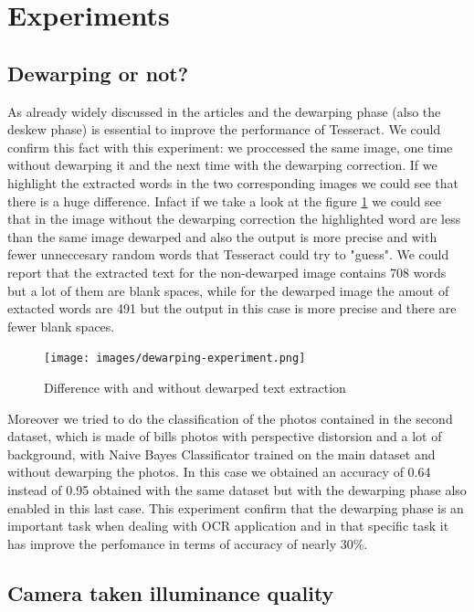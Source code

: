 \documentclass[10pt,twocolumn,letterpaper]{article}
\begin{document}
\section{Experiments}
\label{sec:experiments}

\subsection{Dewarping or not?}

As already widely discussed in the articles
\cite{Improvingcamera-based} and \cite{recoveringhomography} the
dewarping phase (also the deskew phase) is essential to improve the
performance of Tesseract. We could confirm this fact with this
experiment: we proccessed the same image, one time without dewarping
it and the next time with the dewarping correction. If we highlight
the extracted words in the two corresponding images we could see that
there is a huge difference. Infact if we take a look at the figure
\ref{dewarping-experiment} we could see that in the image without the
dewarping correction the highlighted word are less than the same image
dewarped and also the output is more precise and with fewer
unneccesary random words that Tesseract could try to "guess". We could
report that the extracted text for the non-dewarped image contains 708
words but a lot of them are blank spaces, while for the dewarped image
the amout of extacted words are 491 but the output in this case is
more precise and there are fewer blank spaces.

\begin{figure}[b]
  \centering
  \texttt{[image: images/dewarping-experiment.png]}
  \caption{Difference with and without dewarped text extraction}
  \label{dewarping-experiment}
\end{figure}

Moreover we tried to do the classification of the photos contained in
the second dataset, which is made of bills photos with perspective
distorsion and a lot of background, with Naive Bayes Classificator
trained on the main dataset and without dewarping the photos. In this
case we obtained an accuracy of 0.64 instead of 0.95 obtained with the
same dataset but with the dewarping phase also enabled in this last
case. This experiment confirm that the dewarping phase is an important
task when dealing with OCR application and in that specific task it
has improve the perfomance in terms of accuracy of nearly 30\%.

\subsection{Camera taken illuminance quality}
\end{document}
